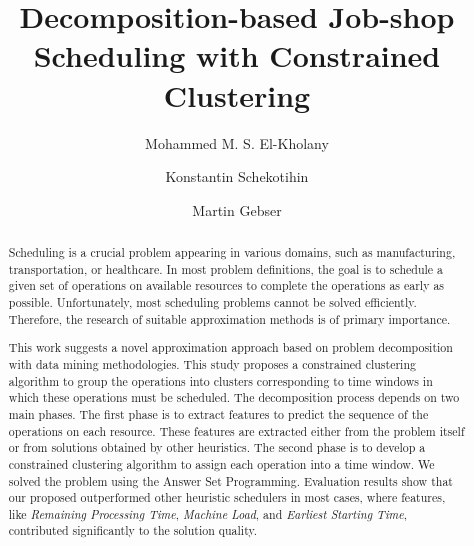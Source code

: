 \documentclass[runningheads]{llncs}
\begin{document}
%
\title{Decomposition-based Job-shop Scheduling with Constrained Clustering}%
%
%
\author{Mohammed M. S. El-Kholany \and
Konstantin Schekotihin \and
Martin Gebser}
%
%
%
\maketitle              %
%
\begin{abstract}
Scheduling is a crucial problem appearing in various domains, such as manufacturing, transportation, or healthcare. In most problem definitions, the goal is to schedule a given set of operations on available resources to complete the operations as early as possible. Unfortunately, most scheduling problems cannot be solved efficiently. Therefore, the research of suitable approximation methods is of primary importance.

This work suggests a novel approximation approach based on problem decomposition with data mining methodologies. This study proposes a constrained clustering algorithm to group the operations into clusters corresponding to time windows in which these operations must be scheduled. 
The decomposition process depends on two main phases. The first phase is to extract features to predict the sequence of the operations on each resource. These features are extracted either from the problem itself or from solutions obtained by other heuristics. The second phase is to develop a constrained clustering algorithm to assign each operation into a time window. We solved the problem using the Answer Set Programming. Evaluation results show that our proposed outperformed other heuristic schedulers in most cases, where features, like \textit{Remaining Processing Time}, \textit{Machine Load}, and \textit{Earliest Starting Time}, contributed significantly to the solution quality.

\end{abstract}
%
%
%
\end{document}
